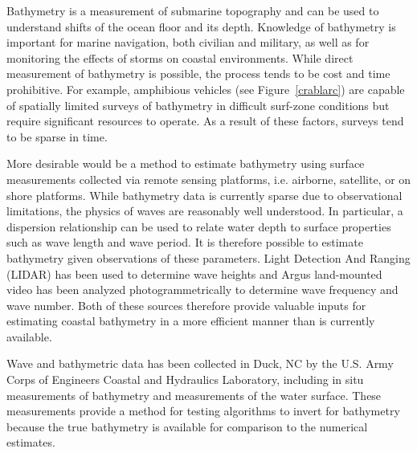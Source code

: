 Bathymetry is a measurement of submarine topography and can be used to understand shifts of the ocean floor and its depth. Knowledge of bathymetry is important for marine navigation, both civilian and military, as well as for monitoring the effects of storms on coastal environments. While direct measurement of bathymetry is possible, the process tends to be cost and time prohibitive. For example, amphibious vehicles (see Figure~\ref{crablarc}) are capable of spatially limited surveys of bathymetry in difficult surf-zone conditions but require significant resources to operate. As a result of these factors, surveys tend to be sparse in time. 

More desirable would be a method to estimate bathymetry using surface measurements collected via remote sensing platforms, i.e. airborne, satellite, or on shore platforms. While bathymetry data is currently sparse due to observational limitations, the physics of waves are reasonably well understood. In particular, a dispersion relationship can be used to relate water depth to surface properties such as wave length and wave period. It is therefore possible to estimate bathymetry given observations of these parameters. Light Detection And Ranging (LIDAR) has been used to determine wave heights and Argus land-mounted video has been analyzed photogrammetrically to determine wave frequency and wave number. Both of these sources therefore provide valuable inputs for estimating coastal bathymetry in a more efficient manner than is currently available.


Wave and bathymetric data has been collected in Duck, NC by the U.S. Army Corps of Engineers Coastal and Hydraulics Laboratory, including in situ measurements of bathymetry and measurements of the water surface. These measurements provide a method for testing algorithms to invert for bathymetry because the true bathymetry is available for comparison to the numerical estimates.
